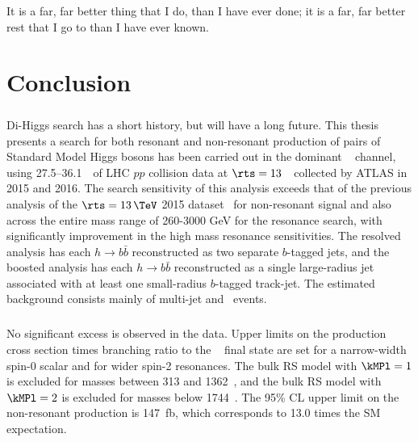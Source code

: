 \begin{savequote}[75mm]
It is a far, far better thing that I do, than I have ever done; it is a far, far better rest that I go to than I have ever known.
\end{savequote}

\chapter{Conclusion}
\label{conclusion}


\paragraph{}
Di-Higgs search has a short history, but will have a long future. This thesis presents a search for both resonant and non-resonant production of pairs of Standard Model Higgs bosons has been carried out in the dominant \bbbb~ channel, using 27.5--36.1~\ifb\ of LHC $pp$ collision data at $\rts = 13$~\TeV\ collected by ATLAS in 2015 and 2016. The search sensitivity of this analysis exceeds that of the previous analysis of the $\rts = 13\,\TeV$ 2015 dataset~\cite{Aaboud:2016xco} for non-resonant signal and also across the entire mass range of 260-3000 GeV for the resonance search, with significantly improvement in the high mass resonance sensitivities. The resolved analysis has each $h \to b\bar{b}$ reconstructed as two separate $b$-tagged jets, and the boosted analysis has each $h \to b\bar{b}$ reconstructed as a single large-radius jet associated with at least one small-radius $b$-tagged track-jet. The estimated background consists mainly of multi-jet and \ttbar\ events.

\paragraph{}
No significant excess is observed in the data. 
Upper limits on the production cross section times branching ratio to the \bbbb~ final state are set for a narrow-width spin-0 scalar and for wider spin-2 resonances. 
The bulk RS model with $\kMPl = 1$ is excluded for masses between 313 and 1362~\GeV, and the bulk RS model with $\kMPl = 2$ is excluded for masses below 1744~\GeV.
The 95\% CL upper limit on the non-resonant production is 147~fb, which corresponds to 13.0 times the SM expectation.

